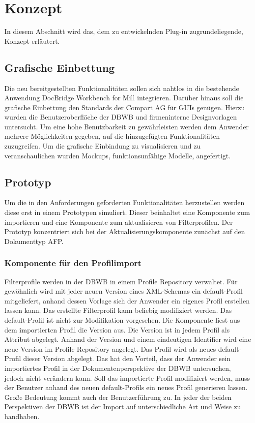 \section{Konzept}{
\label{sec:konzept}
In diesem Abschnitt wird das, dem zu entwickelnden Plug-in zugrundeliegende, Konzept erläutert.

\subsection{Grafische Einbettung}{
Die neu bereitgestellten Funktionalitäten sollen sich nahtlos in die bestehende Anwendung DocBridge\textsuperscript{\textregistered} Workbench for Mill integrieren. Darüber hinaus soll die grafische Einbettung den Standards der Compart AG für \ac{GUI}s genügen. Hierzu wurden die Benutzeroberfläche der \ac{DBWB} und firmeninterne Designvorlagen untersucht. Um eine hohe Benutzbarkeit zu gewährleisten werden dem Anwender mehrere Möglichkeiten gegeben, auf die hinzugefügten Funktionalitäten zuzugreifen. Um die grafische Einbindung zu visualisieren und zu veranschaulichen wurden \glspl{Mockup}, funktionsunfähige Modelle, angefertigt.
}

\subsection{Prototyp}{
Um die in den Anforderungen geforderten Funktionalitäten herzustellen werden diese erst in einem Prototypen simuliert. Dieser beinhaltet eine Komponente zum importieren und eine Komponente zum aktualisieren von Filterprofilen. Der Prototyp konzentriert sich bei der Aktualisierungskomponente zunächst auf den Dokumenttyp \ac{AFP}. 


\subsubsection{Komponente für den Profilimport}{
\label{sec:komp_profilimport}
Filterprofile werden in der \ac{DBWB} in einem Profile Repository verwaltet. Für gewöhnlich wird mit jeder neuen Version eines XML-Schemas ein default-Profil mitgeliefert, anhand dessen Vorlage sich der Anwender ein eigenes Profil erstellen lassen kann. Das erstellte Filterprofil kann beliebig modifiziert werden. Das default-Profil ist nicht zur Modifikation vorgesehen. Die Komponente liest aus dem importierten Profil die Version aus. Die Version ist in jedem Profil als Attribut abgelegt. Anhand der Version und einem eindeutigen Identifier wird eine neue Version im Profile Repository angelegt. Das Profil wird als neues default-Profil dieser Version abgelegt. Das hat den Vorteil, dass der Anwender sein importiertes Profil in der Dokumentenperspektive der \ac{DBWB} untersuchen, jedoch nicht verändern kann. Soll das importierte Profil modifiziert werden, muss der Benutzer anhand des neuen default-Profils ein neues Profil generieren lassen. Große Bedeutung kommt auch der Benutzerführung zu. In jeder der beiden Perspektiven der \ac{DBWB} ist der Import auf unterschiedliche Art und Weise zu handhaben. 


}}}
